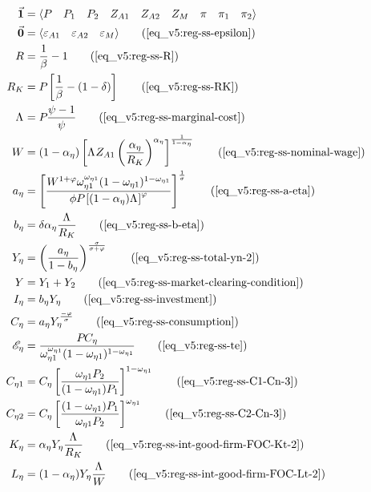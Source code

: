 \documentclass[../thesis.tex]{subfiles}
\begin{document}
	\begin{align}
		\vec{\bm{1}} &= \langle \begin{matrix} P & P_{1} & P_{2} & Z_{A1} & Z_{A2} & Z_{M} & \pi & \pi_{1} & \pi_{2} \end{matrix} \rangle \label{eq_v5:reg-unity-vector}
		\\
		\vec{\bm{0}} &= \langle \begin{matrix} \varepsilon_{A1} & \varepsilon_{A2} & \varepsilon_{M} \end{matrix} \rangle \tag{\ref{eq_v5:reg-ss-epsilon}}
		\\
		R &= \frac{1}{\beta} - 1 \tag{\ref{eq_v5:reg-ss-R}}
		\\
		R_K &= P_{} \left[ \frac{1}{\beta} - (1-\delta) \right] \tag{\ref{eq_v5:reg-ss-RK}}
		\\
		\Lambda_{} &= P_{} \frac{\psi-1}{\psi} \tag{\ref{eq_v5:reg-ss-marginal-cost}}
		\\
		W &= (1-\alpha_{\eta}) \left[ \Lambda_{} Z_{A1} \left( \frac{{\alpha_{\eta}}}{R_K} \right)^{{\alpha_{\eta}}} \right]^\frac{1}{1-\alpha_{\eta}} \tag{\ref{eq_v5:reg-ss-nominal-wage}}
		\\ %
		a_{\eta} &= \left[ \frac{W^{1 +\varphi} \omega_{\eta 1}^{\omega_{\eta 1}} (1 -\omega_{\eta 1})^{1 -\omega_{\eta 1}}}{\phi P_{} \left[ (1 -\alpha_{\eta}) \Lambda_{} \right]^{\varphi}} \right]^{\frac{1}{\sigma}} \tag{\ref{eq_v5:reg-ss-a-eta}}
		\\
		b_{\eta} &= \delta {\alpha_{\eta}} \frac{\Lambda_{}}{R_K} \tag{\ref{eq_v5:reg-ss-b-eta}}
		\\
		Y_{\eta} &= \left( \frac{a_{\eta}}{1 - b_{\eta}} \right)^{\frac{\sigma}{\sigma + \varphi}} \tag{\ref{eq_v5:reg-ss-total-yn-2}}
		\\
		Y &= Y_{1} + Y_{2} \tag{\ref{eq_v5:reg-ss-market-clearing-condition}}
		\\
		I_{\eta} &= b_{\eta} Y_{\eta} \tag{\ref{eq_v5:reg-ss-investment}}
		\\
		C_{\eta} &= a_{\eta} Y_{\eta}^{\frac{-\varphi}{\sigma}} \tag{\ref{eq_v5:reg-ss-consumption}}
		\\
		\te[] &= \frac{P_{} C_{\eta}}{\omega_{\eta 1}^{\omega_{\eta 1}} (1 -\omega_{\eta 1})^{1 -\omega_{\eta 1}}} \tag{\ref{eq_v5:reg-ss-te}}
		\\
		C_{\eta 1} &= C_{\eta} \left[ \frac{\omega_{\eta 1} P_{2}}{(1 - \omega_{\eta 1}) P_{1}} \right]^{1-\omega_{\eta 1}} \tag{\ref{eq_v5:reg-ss-C1-Cn-3}}
		\\
		C_{\eta 2} &= C_{\eta} \left[ \frac{(1 - \omega_{\eta 1}) P_{1}}{\omega_{\eta 1} P_{2}} \right]^{\omega_{\eta 1}} \tag{\ref{eq_v5:reg-ss-C2-Cn-3}}
		\\
		K_{\eta} &= {\alpha_{\eta}} Y_{\eta} \frac{\Lambda_{}}{R_K} \tag{\ref{eq_v5:reg-ss-int-good-firm-FOC-Kt-2}}
		\\
		L_{\eta} &= (1-\alpha_{\eta}) Y_{\eta} \frac{\Lambda_{}}{W} \tag{\ref{eq_v5:reg-ss-int-good-firm-FOC-Lt-2}}
	\end{align}
\end{document}
